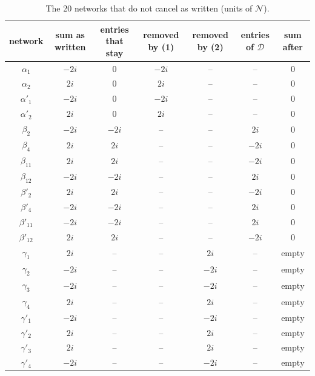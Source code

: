 \documentclass[10pt]{article}
\numberwithin{equation}{section}
\newcommand{\NN}{\mathcal N}
\begin{document}
\begin{table}[h]
\centering\small
\begin{tabular}{@{}c c c c c c c@{}}
network & sum as written & entries that stay & removed by (1) & removed by (2) & entries of $\mathcal D$ & sum after\\ \hline
$\alpha_{1}$ & $-2i$ & $0$ & $-2i$ & $\text{--}$ & $\text{--}$ & $0$\\
$\alpha_{2}$ & $2i$ & $0$ & $2i$ & $\text{--}$ & $\text{--}$ & $0$\\
$\alpha'_{1}$ & $-2i$ & $0$ & $-2i$ & $\text{--}$ & $\text{--}$ & $0$\\
$\alpha'_{2}$ & $2i$ & $0$ & $2i$ & $\text{--}$ & $\text{--}$ & $0$\\
$\beta_{2}$ & $-2i$ & $-2i$ & $\text{--}$ & $\text{--}$ & $2i$ & $0$\\
$\beta_{4}$ & $2i$ & $2i$ & $\text{--}$ & $\text{--}$ & $-2i$ & $0$\\
$\beta_{11}$ & $2i$ & $2i$ & $\text{--}$ & $\text{--}$ & $-2i$ & $0$\\
$\beta_{12}$ & $-2i$ & $-2i$ & $\text{--}$ & $\text{--}$ & $2i$ & $0$\\
$\beta'_{2}$ & $2i$ & $2i$ & $\text{--}$ & $\text{--}$ & $-2i$ & $0$\\
$\beta'_{4}$ & $-2i$ & $-2i$ & $\text{--}$ & $\text{--}$ & $2i$ & $0$\\
$\beta'_{11}$ & $-2i$ & $-2i$ & $\text{--}$ & $\text{--}$ & $2i$ & $0$\\
$\beta'_{12}$ & $2i$ & $2i$ & $\text{--}$ & $\text{--}$ & $-2i$ & $0$\\
$\gamma_{1}$ & $2i$ & $\text{--}$ & $\text{--}$ & $2i$ & $\text{--}$ & $\text{empty}$\\
$\gamma_{2}$ & $-2i$ & $\text{--}$ & $\text{--}$ & $-2i$ & $\text{--}$ & $\text{empty}$\\
$\gamma_{3}$ & $-2i$ & $\text{--}$ & $\text{--}$ & $-2i$ & $\text{--}$ & $\text{empty}$\\
$\gamma_{4}$ & $2i$ & $\text{--}$ & $\text{--}$ & $2i$ & $\text{--}$ & $\text{empty}$\\
$\gamma'_{1}$ & $-2i$ & $\text{--}$ & $\text{--}$ & $-2i$ & $\text{--}$ & $\text{empty}$\\
$\gamma'_{2}$ & $2i$ & $\text{--}$ & $\text{--}$ & $2i$ & $\text{--}$ & $\text{empty}$\\
$\gamma'_{3}$ & $2i$ & $\text{--}$ & $\text{--}$ & $2i$ & $\text{--}$ & $\text{empty}$\\
$\gamma'_{4}$ & $-2i$ & $\text{--}$ & $\text{--}$ & $-2i$ & $\text{--}$ & $\text{empty}$\\
\end{tabular}
\caption{The 20 networks that do not cancel as written (units of $\NN$).}
\label{C:tab:diag}
\end{table}
\end{document}
